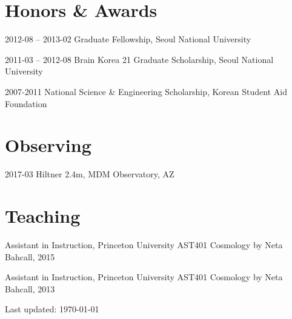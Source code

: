 \documentclass[11pt,letterpaper]{article}
\renewenvironment{itemize}{
  \begin{list}{}{
    \setlength{\leftmargin}{1.5em}
  }
}{
  \end{list}
}
\begin{document}
\section*{Honors \& Awards}

\begin{itemize}
  \setlength\itemsep{0em}
  \item 2012-08 -- 2013-02 Graduate Fellowship, Seoul National University
  \item 2011-03 -- 2012-08 Brain Korea 21 Graduate Scholarship, Seoul National University
  \item 2007-2011 National Science \& Engineering Scholarship, Korean Student Aid Foundation
\end{itemize}

\section*{Observing}
\begin{itemize}
  \item 2017-03 Hiltner 2.4m, MDM Observatory, AZ
\end{itemize}

\section*{Teaching}

\begin{itemize}
  \setlength\itemsep{0em}
  \item Assistant in Instruction, Princeton University
    AST401 Cosmology by Neta Bahcall, 2015
  \item Assistant in Instruction, Princeton University
    AST401 Cosmology by Neta Bahcall, 2013
\end{itemize}

\bigskip

\begin{center}
  \begin{footnotesize}
    Last updated: \today \\
  \end{footnotesize}
\end{center}
\end{document}

